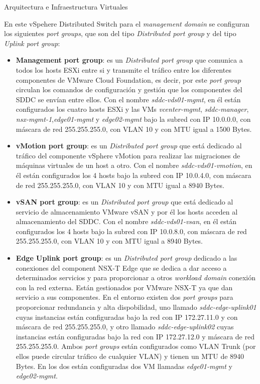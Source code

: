 \begin{subsection}{Arquitectura e Infraestructura Virtuales\cite{CFVirtInfraes}}
\begin{itemize}
\end{itemize}
En este vSpehere Distributed Switch para el \textit{management domain} se configuran los siguientes \textit{port groups}, que son del tipo \textit{Distributed port group} y del tipo \textit{Uplink port group}:
\begin{itemize}
       
        \item \textbf{Management port group}: es un \textit{Distributed port group} que comunica a todos los hosts ESXi entre si y transmite el tráfico entre los diferentes componentes de VMware Cloud Foundation, es decir, por este \textit{port group} circulan los comandos de configuración y gestión que los componentes del SDDC se envían entre ellos. Con el nombre \textit{sddc-vds01-mgmt}, en él están configurados los cuatro hosts ESXi y las VMs \textit{vcenter-mgmt}, \textit{sddc-manager}, \textit{nsx-mgmt-1},\textit{edge01-mgmt} y \textit{edge02-mgmt} bajo la subred con IP 10.0.0.0, con máscara de red 255.255.255.0, con VLAN 10 y con MTU igual a 1500 Bytes.
        
        \item \textbf{vMotion port group}: es un \textit{Distributed port group} que está dedicado al tráfico del componente vSphere vMotion para realizar las migraciones de máquinas virtuales de un host a otro. Con el nombre \textit{sddc-vds01-vmotion}, en él están configurados los 4 hosts bajo la subred con IP 10.0.4.0, con máscara de red 255.255.255.0, con VLAN 10 y con MTU igual a 8940 Bytes.
        
        \item \textbf{vSAN port group}: es un \textit{Distributed port group} que está dedicado al servicio de almacenamiento VMware vSAN y por él los hosts acceden al almacenamiento del SDDC. Con el nombre \textit{sddc-vds01-vsan}, en él están configurados los 4 hosts bajo la subred con IP 10.0.8.0, con máscara de red 255.255.255.0, con VLAN 10 y con MTU igual a 8940 Bytes.
        
        \item \textbf{Edge Uplink port group}: es un \textit{Distributed port group} dedicado a las conexiones del component NSX-T Edge que se dedica a dar acceso a determinados servicios y para proporcionar a otros \textit{workload domain} conexión con la red externa. Están gestionados por VMware NSX-T ya que dan servicio a sus componentes. En el entorno existen dos \textit{port groups} para proporcionar redundancia y alta dispobilidad, uno llamado \textit{sddc-edge-uplink01} cuyas instancias están configuradas bajo la red con IP 172.27.11.0 y con máscara de red 255.255.255.0, y otro llamado \textit{sddc-edge-uplink02} cuyas instancias están configuradas bajo la red con IP 172.27.12.0 y máscara de red 255.255.255.0. Ambos \textit{port groups} están configurados como VLAN Trunk (por ellos puede circular tráfico de cualquier VLAN) y tienen un MTU de 8940 Bytes. En los dos están configuradas dos VM llamadas \textit{edge01-mgmt} y \textit{edge02-mgmt}.
        

\end{itemize}
\end{subsection}
